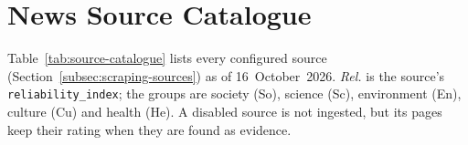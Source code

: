 %

\chapter{News Source Catalogue}
\label{app:sources}

Table~\ref{tab:source-catalogue} lists every configured source
(Section~\ref{subsec:scraping-sources}) as of 16~October~2026.
\emph{Rel.} is the source's \texttt{reliability\_index}; the groups are
society (So), science (Sc), environment (En), culture (Cu) and health
(He). A disabled source is not ingested, but its pages keep their
rating when they are found as evidence.


